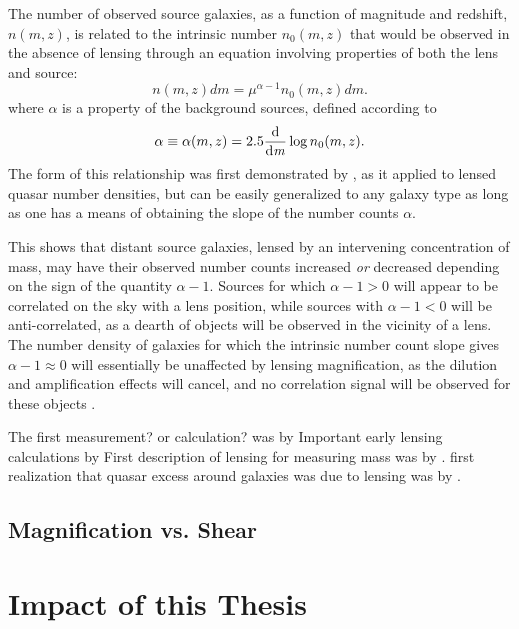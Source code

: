 The number of observed source galaxies, as a function of magnitude and redshift, $n(m,z)$, is related to the intrinsic number $n_0(m,z)$ that would be observed in the absence of lensing through an equation involving properties of both the lens and source:
\begin{equation}
n(m,z)dm = \mu ^{\alpha -1} n_0(m,z)dm.
\end{equation}
where $\alpha$ is a property of the background sources, defined according to
\begin{equation}
\alpha \equiv \alpha(m,z) = 2.5 \frac{\mathrm d}{\mathrm d \it m} \log n_0(m,z).
\label{alpha}
\end{equation}
The form of this relationship was first demonstrated by \citet{Narayan89}, as it applied to lensed quasar number densities, but can be easily generalized to any galaxy type as long as one has a means of obtaining the slope of the number counts $\alpha$.

This shows that distant source galaxies, lensed by an intervening concentration of mass, may have their observed number counts increased {\it or} decreased depending on the sign of the quantity $\alpha -1$.  Sources for which $\alpha -1 > 0$ will appear to be correlated on the sky with a lens position, while sources with $\alpha -1 < 0$ will be anti-correlated, as a dearth of objects will be observed in the vicinity of a lens.  The number density of galaxies for which the intrinsic number count slope gives $\alpha -1 \approx 0$ will essentially be unaffected by lensing magnification, as the dilution and amplification effects will cancel, and no correlation signal will be observed for these objects \citep{Scranton05}.

The first measurement? or calculation? was by \citet{Broadhurst95}
Important early lensing calculations by \citet{KS93} First description of lensing for measuring mass was by \citet{Tyson84}. first realization that quasar excess around galaxies was due to lensing was by \citet{Narayan89}.

\subsection{Magnification vs. Shear}

\section{Impact of this Thesis}
\label{sec:impact}

